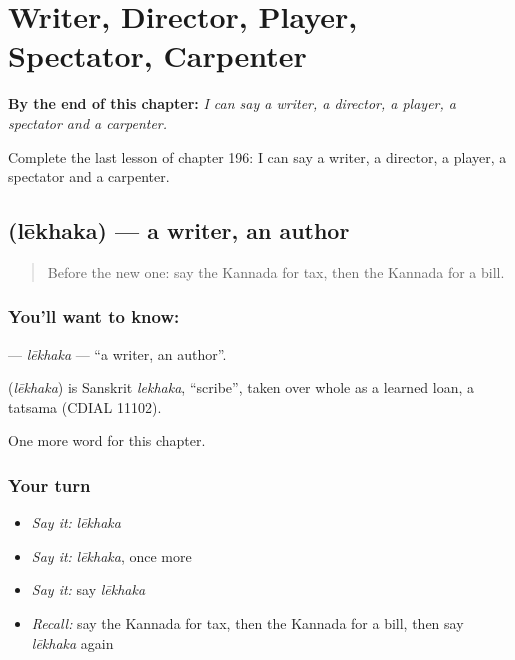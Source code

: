
\chapter{Writer, Director, Player, Spectator, Carpenter}
\label{ch:ka-writer-director-player-spectator-carpenter}

\begin{chapteropening}
\textbf{By the end of this chapter:} \emph{I can say a writer, a director, a player, a spectator and a carpenter.}

Complete the last lesson of chapter 196: I can say a writer, a director, a player, a spectator and a carpenter.
\end{chapteropening}

\section[\texorpdfstring{\kn{ಲೇಖಕ} (lēkhaka)}{ಲೇಖಕ (lēkhaka)}]{ (lēkhaka) — a writer, an author}

\label{lesson:KA-C196-lekhaka}



\begin{quote}
Before the new one: say the Kannada for tax, then the Kannada for a bill.
\end{quote}

\subsection*{You'll want to know: }
\textbf{} — \emph{lēkhaka} — \textquotedblleft{}a writer, an author\textquotedblright{}.

\begin{cousinweb}
\textbf{} (\emph{lēkhaka}) is Sanskrit \emph{lekhaka}, \textquotedblleft{}scribe\textquotedblright{}, taken over whole as a learned loan, a tatsama (CDIAL 11102).
\end{cousinweb}

\begin{grammarlens}[title={What you've built}]
One more word for this chapter.
\end{grammarlens}

\subsection*{Your turn}
\begin{itemize}
\raggedright
  \item \emph{Say it:} \emph{lēkhaka}
  \item \emph{Say it:} \emph{lēkhaka}, once more
  \item \emph{Say it:} say \emph{lēkhaka}
  \item \emph{Recall:} say the Kannada for tax, then the Kannada for a bill, then say \emph{lēkhaka} again
\end{itemize}

